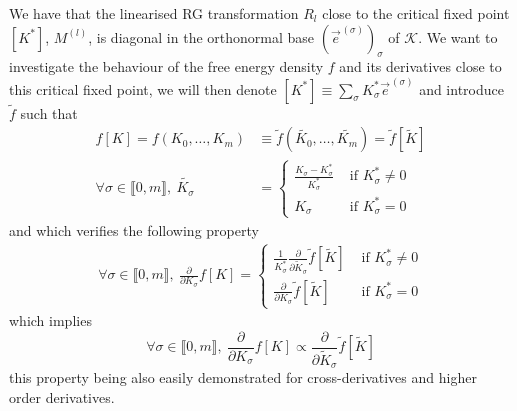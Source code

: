 \documentclass[class=report, float=false, crop=false]{standalone}
\begin{document}
We have that the linearised RG transformation $R_l$ close to the critical fixed point $[K^*]$, $M^{(l)}$, is diagonal in the orthonormal base $(\vec{e}^{\hspace{1pt}(\sigma)})_{\sigma}$ of $\mathcal{K}$. We want to investigate the behaviour of the free energy density $f$ and its derivatives close to this critical fixed point, we will then denote $[K^*]\equiv \sum_{\sigma} K^*_{\sigma}\vec{e}^{\hspace{1pt}(\sigma)}$ and introduce $\tilde{f}$ such that
\begin{equation}
\begin{aligned}
f[K]=f(K_0,\ldots,K_m)&\equiv\tilde{f}(\tilde{K_0},\ldots,\tilde{K_m})=\tilde{f}[\tilde{K}]\\
\forall \sigma \in \llbracket0,m\rrbracket,~ \tilde{K_{\sigma}} &= \begin{cases} \frac{K_{\sigma}-K_{\sigma}^*}{K_{\sigma}^*} &\text{ if } K_{\sigma}^* \neq 0 \\ K_{\sigma} &\text{ if } K_{\sigma}^* = 0 \end{cases}
\end{aligned}
\end{equation}
and which verifies the following property
\begin{align*}
\forall \sigma \in \llbracket0,m\rrbracket,~ \frac{\partial}{\partial K_{\sigma}} f[K] = \begin{cases} \frac{1}{K_{\sigma}^*} \frac{\partial}{\partial \tilde{K}_{\sigma}} \tilde{f}[\tilde{K}] &\text{ if } K_{\sigma}^* \neq 0 \\ \frac{\partial}{\partial K_{\sigma}} \tilde{f}[\tilde{K}] &\text{ if } K_{\sigma}^* = 0 \end{cases}
\end{align*}
which implies
\begin{equation}
\forall \sigma \in \llbracket0,m\rrbracket,~ \frac{\partial}{\partial K_{\sigma}} f[K] \propto \frac{\partial}{\partial \tilde{K}_{\sigma}} \tilde{f}[\tilde{K}]
\end{equation}
this property being also easily demonstrated for cross-derivatives and higher order derivatives.\\
\end{document}
